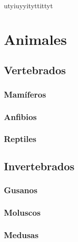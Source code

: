 \documentclass{article}
\begin{document}
utyiuyyityttittyt
\section{Animales}
\subsection{Vertebrados}
\subsubsection{Mamíferos}
\subsubsection{Anfibios}
\subsubsection{Reptiles}
\subsubsection{}
\subsection{Invertebrados}
\subsubsection{Gusanos}
\subsubsection{Moluscos}
\subsubsection{Medusas}
\subsubsection{}
\end{document}
